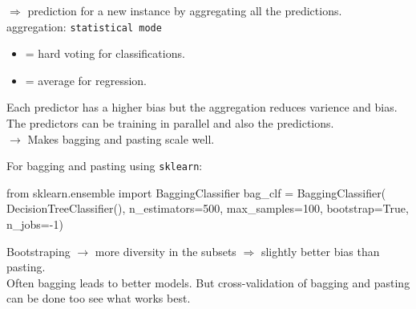 $\Rightarrow$ prediction for a new instance by aggregating all the predictions.\\
aggregation: \verb;statistical mode;
\begin{itemize}
    \item = hard voting for classifications.
    \item = average for regression.
\end{itemize}
Each predictor has a higher bias but the aggregation reduces varience and bias.\\

The predictors can be training in parallel and also the predictions.\\
$\rightarrow$ Makes bagging and pasting scale well.

For bagging and pasting using \verb;sklearn;:
\begin{python}
    from sklearn.ensemble import BaggingClassifier
    bag_clf = BaggingClassifier(
            DecisionTreeClassifier(), n_estimators=500,
            max_samples=100, bootstrap=True, n_jobs=-1)
\end{python}

Bootstraping $\rightarrow$ more diversity in the subsets $\Rightarrow$ slightly
better bias than pasting.\\

Often bagging leads to better models.
But cross-validation of bagging and pasting can be done too see what works best.

